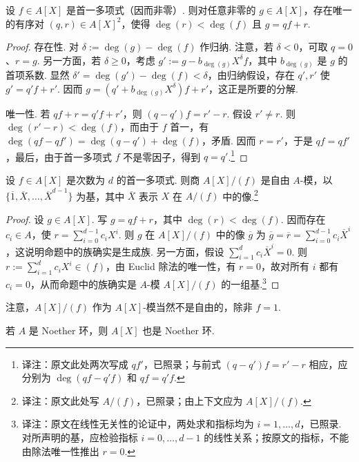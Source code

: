 \begin{proposition*}[{Euclid 除法}]
设 $f\in A[X]$ 是首一多项式（因而非零）. 则对任意非零的 $g\in A[X]$，存在唯一的有序对 $(q,r)\in A[X]^2$，使得 $\deg(r)<\deg(f)$ 且 $g=qf+r$.
\end{proposition*}
\begin{proof}
存在性. 对 $\delta:=\deg(g)-\deg(f)$ 作归纳. 注意，若 $\delta<0$，可取 $q=0$、$r=g$. 另一方面，若 $\delta\geq0$，考虑 $g':=g-b_{\deg(g)}X^\delta f$，其中 $b_{\deg(g)}$ 是 $g$ 的首项系数. 显然 $\delta'=\deg(g')-\deg(f)<\delta$，由归纳假设，存在 $q',r'$ 使 $g'=q'f+r'$. 因而 $g=(q'+b_{\deg(g)}X^\delta)f+r'$，这正是所要的分解.

唯一性. 若 $qf+r=q'f+r'$，则 $(q-q')f=r'-r$. 假设 $r'\ne r$. 则 $\deg(r'-r)<\deg(f)$，而由于 $f$ 首一，有 $\deg(qf-qf')=\deg(q-q')+\deg(f)$，矛盾. 因而 $r=r'$，于是 $qf=qf'$，最后，由于首一多项式 $f$ 不是零因子，得到 $q=q'$.\footnote{译注：原文此处两次写成 $qf'$，已照录；与前式 $(q-q')f=r'-r$ 相应，应分别为 $\deg(qf-q'f)$ 和 $qf=q'f$.}
\end{proof}
\begin{corollary*}
设 $f\in A[X]$ 是次数为 $d$ 的首一多项式. 则商 $A[X]/(f)$ 是自由 $A$-模，以 $\{\overline1,\overline X,\ldots,\overline X^{d-1}\}$ 为基，其中 $\overline X$ 表示 $X$ 在 $A/(f)$ 中的像.\footnote{译注：原文此处写 $A/(f)$，已照录；由上下文应为 $A[X]/(f)$.}
\end{corollary*}
\begin{proof}
设 $g\in A[X]$. 写 $g=qf+r$，其中 $\deg(r)<\deg(f)$. 因而存在 $c_i\in A$，使 $r=\sum_{i=0}^{d-1}c_iX^i$. 则 $g$ 在 $A[X]/(f)$ 中的像 $\overline g$ 为 $\overline g=\overline r=\sum_{i=0}^{d-1}c_i\overline X^i$，这说明命题中的族确实是生成族. 另一方面，假设 $\sum_{i=1}^d c_i\overline X^i=0$. 则 $r:=\sum_{i=1}^d c_iX^i\in(f)$，由 Euclid 除法的唯一性，有 $r=0$，故对所有 $i$ 都有 $c_i=0$，从而命题中的族确实是 $A$-模 $A[X]/(f)$ 的一组基.\footnote{译注：原文在线性无关性的论证中，两处求和指标均为 $i=1,\ldots,d$，已照录. 对所声明的基，应检验指标 $i=0,\ldots,d-1$ 的线性关系；按原文的指标，不能由除法唯一性推出 $r=0$.}
\end{proof}
\begin{remark*}
注意，$A[X]/(f)$ 作为 $A[X]$-模当然不是自由的，除非 $f=1$.
\end{remark*}
\begin{theorem*}
若 $A$ 是 Noether 环，则 $A[X]$ 也是 Noether 环.
\end{theorem*}
